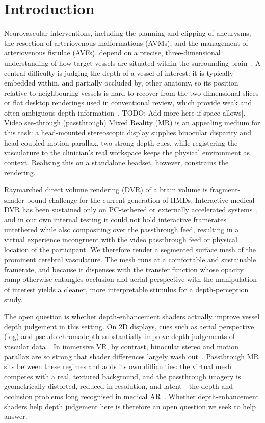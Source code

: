\documentclass[runningheads]{llncs}
\begin{document}
\section{Introduction}\label{sec:intro}
Neurovascular interventions, including the planning and clipping of aneurysms, the resection of arteriovenous malformations (AVMs), and the management of arteriovenous fistulae (AVFs), depend on a precise, three-dimensional understanding of how target vessels are situated within the surrounding brain~\cite{kersten-oertel_augmented_2015-1}. A central difficulty is judging the depth of a vessel of interest: it is typically embedded within, and partially occluded by, other anatomy, so its position relative to neighbouring vessels is hard to recover from the two-dimensional slices or flat desktop renderings used in conventional review, which provide weak and often ambiguous depth information~\cite{kersten-oertel_augmented_2015-1}. TODO: Add more here if space allows]. Video see-through (passthrough) Mixed Reality (MR) is an appealing medium for this task: a head-mounted stereoscopic display supplies binocular disparity and head-coupled motion parallax, two strong depth cues, while registering the vasculature to the clinician's real workspace keeps the physical environment as context. Realising this on a standalone headset, however, constrains the rendering.

Raymarched direct volume rendering (DVR) of a brain volume is fragment-shader-bound challenge for the current generation of HMDs. Interactive medical DVR has been sustained only on PC-tethered or externally accelerated systems~\cite{faludi_multivolume_2025}, and in our own internal testing it could not hold interactive framerates untethered while also compositing over the passthrough feed, resulting in a virtual experience incongruent with the video passthrough feed or physical location of the participant. We therefore render a segmented surface mesh of the prominent cerebral vasculature. The mesh runs at a comfortable and sustainable framerate, and because it dispenses with the transfer function whose opacity ramp otherwise entangles occlusion and aerial perspective with the manipulation of interest yields a cleaner, more interpretable stimulus for a depth-perception study.

The open question is whether depth-enhancement shaders actually improve vessel depth judgement in this setting. On 2D displays, cues such as aerial perspective (fog) and pseudo-chromadepth substantially improve depth judgements of vascular data~\cite{kersten-oertel_evaluation_2014,ropinski_visually_2006}. In immersive VR, by contrast, binocular stereo and motion parallax are so strong that shader differences largely wash out~\cite{heinrich_estimating_2021,titov_effect_2021}. Passthrough MR sits between these regimes and adds its own difficulties: the virtual mesh competes with a real, textured background, and the passthrough imagery is geometrically distorted, reduced in resolution, and latent - the depth and occlusion problems long recognised in medical AR~\cite{macedo_occlusion_2023,adams_depth_2022}. Whether depth-enhancement shaders help depth judgement here is therefore an open question we seek to help answer.
\end{document}
